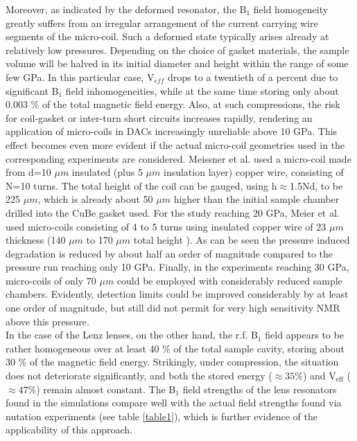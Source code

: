 \documentclass[aip,rsi,reprint,graphicx]{revtex4-1} %
\begin{document}
 Moreover, as indicated by the \grqq deformed resonator\grqq, the B$_1$ field homogeneity greatly suffers from an irregular arrangement of the current carrying wire segments of the micro-coil. Such a deformed state typically arises already at relatively low pressures. Depending on the choice of gasket materials, the sample volume will be halved in its initial diameter and height within the range of some  few GPa. In this particular case, V$_{eff}$ drops to a twentieth of a percent due to significant B$_1$ field inhomogeneities, while at the same time storing only about 0.003 \% of the total magnetic field energy. Also, at such compressions, the risk for coil-gasket or inter-turn short circuits increases rapidly\cite{Meier2016}, rendering an application of micro-coils in DACs increasingly unreliable above 10  GPa. This effect becomes even more evident if the actual micro-coil geometries used in the corresponding experiments are considered. Meissner et al. used a micro-coil made from d=10 $\mu m$ insulated (plus 5 $\mu m$ insulation layer) copper wire, consisting of N=10 turns\cite{Meissner2012}. The total height of the coil can be gauged, using h$\approx$1.5Nd\cite{Peck1995}, to be 225 $\mu m$, which is already about 50 $\mu m$ higher than the initial sample chamber drilled into the CuBe gasket used. For the study reaching 20 GPa, Meier et al. used micro-coils consisting of 4 to 5 turns using insulated copper wire of 23 $\mu m$ thickness (140 $\mu m$ to 170 $\mu m$ total height ). As can be seen the pressure induced degradation is reduced by about half an order of magnitude compared to the pressure run reaching only 10 GPa. Finally, in the experiments reaching 30 GPa, micro-coils of only 70 $\mu m$ could be employed with considerably reduced sample chambers. Evidently, detection limits could be improved considerably by at least one order of magnitude, but still did not permit for very high sensitivity NMR above this pressure.\\
 In the case of the Lenz lenses, on the other hand, the r.f. B$_1$ field appears to be rather homogeneous over at least 40 \% of the total sample cavity, storing about 30 \% of the magnetic field energy. Strikingly, under compression, the situation does not deteriorate significantly, and both the stored energy ($\approx 35 \%$) and V$_{\text{eff}}$ ($\approx 47 \%$) remain almost constant. The B$_1$ field strengths of the lens resonators found in the simulations compare well with the actual field strengths found via nutation experiments (see table \ref{table1}), which is further evidence of the applicability of this approach.\\
 
\end{document}
